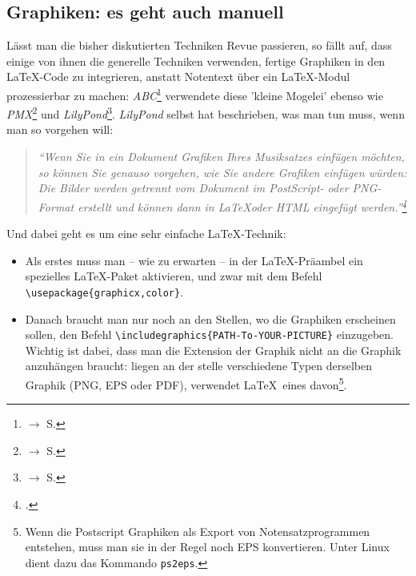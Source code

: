 %
%
%


\subsection{Graphiken: es geht auch manuell}
\label{IncludeGraphics}

Lässt man die bisher diskutierten Techniken Revue passieren, so fällt auf, dass
einige von ihnen die generelle Techniken verwenden, fertige Graphiken in den
\LaTeX-Code zu integrieren, anstatt Notentext über ein \LaTeX-Modul prozessierbar
zu machen: \textit{ABC}\footnote{$\rightarrow$ S. \pageref{AbcGraphics}}
verwendete diese 'kleine Mogelei' ebenso wie \textit{PMX}\footnote{$\rightarrow$
S. \pageref{PmxGraphics}} und \textit{LilyPond}\footnote{$\rightarrow$ S.
\pageref{LilyPondGraphics}}. \textit{LilyPond} selbst hat beschrieben, was man tun
muss, wenn man so vorgehen will:

\begin{quote}\textit{\enquote{Wenn Sie in ein Dokument Grafiken Ihres
Musiksatzes einfügen möchten, so können Sie genauso vorgehen, wie Sie andere
Grafiken einfügen würden: Die Bilder werden getrennt vom Dokument im PostScript-
oder PNG-Format erstellt und können dann in \LaTeX oder HTML eingefügt
werden.}\footcite[vgl.][20]{LilyPond2018e} }\end{quote}

Und dabei geht es um eine sehr einfache \LaTeX-Technik:

\begin{itemize}
  \item Als erstes muss man -- wie zu erwarten -- in der \LaTeX-Präambel ein
  spezielles \LaTeX-Paket aktivieren, und zwar mit dem Befehl
  \texttt{\textbackslash{usepackage}\{graphicx,color\}}.
  \item Danach braucht man nur noch an den Stellen, wo die Graphiken erscheinen
  sollen, den Befehl
  \texttt{\textbackslash{includegraphics}\{PATH-To-YOUR-PICTURE\}} einzugeben.
  Wichtig ist dabei, dass man die Extension der Graphik nicht an die Graphik
  anzuhängen braucht: liegen an der stelle verschiedene Typen derselben Graphik
  (PNG, EPS oder PDF), verwendet \LaTeX\ eines davon\footnote{Wenn die Postscript
  Graphiken als Export von Notensatzprogrammen entstehen, muss man sie in der
  Regel noch EPS konvertieren. Unter Linux dient dazu das Kommando \texttt{ps2eps}.}.
\end{itemize}

